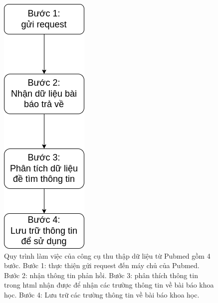 \documentclass[../DoAn.tex]{subfiles}
\begin{document}
\begin{figure}
\centering
\includegraphics[width=0.35\linewidth]{Hinh_ve/craw.png}
\caption{Quy trình làm việc của công cụ thu thập dữ liệu từ Pubmed gồm 4 bước. Bước 1: thực thiện gửi request đến máy chủ của Pubmed. Bước 2: nhận thông tin phản hồi. Bước 3: phân thích thông tin trong html nhận được để nhận các trường thông tin về bài báo khoa học. Bước 4: Lưu trữ các trường thông tin về bài báo khoa học.}
\label{fig:crawPubmed}
\end{figure}
\end{document}
